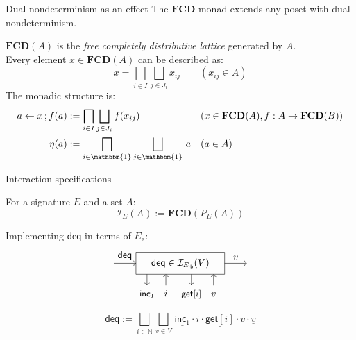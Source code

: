 \documentclass[aspectratio=141]{beamer}
\newcommand{\kw}[1]{\ensuremath{ \mathsf{#1} }}
\newcommand{\deqpic}[3]{%
  \begin{tikzpicture}[scale=0.4]
    \draw[->] (-6,0) -- node[above] {$\kw{deq}$} (-4,0);
    \draw (-4,-1) rectangle (4,1);
    \node (x) at (0,0) {$#1$};
    \draw[->] (-3, -1) -- (-3, -2);
    \node[anchor=base] at (-3, -3) {\small $\kw{inc}_1$};
    \draw[<-] (-1.3, -1) -- (-1.3, -2);
    \node[anchor=base] at (-1.3, -3) {$#2$};
    \draw[->] (1, -1) -- (1, -2);
    \node[anchor=base] at (1, -3) {\small $\kw{get}[#2]$};
    \draw[<-] (3, -1) -- (3, -2);
    \node[anchor=base] at (3, -3) {$#3$};
    \draw[->] (4,0) -- node[above] {$#3$} (6,0);
  \end{tikzpicture}%
}
\begin{document}
\begin{frame}{Dual nondeterminism as an effect} %
The $\mathbf{FCD}$ monad extends any poset with dual nondeterminism.

\pause
\begin{definition}
$\mathbf{FCD}(A)$ is the \emph{free completely distributive lattice}
generated by $A$. \\
Every element $x \in \mathbf{FCD}(A)$ can be described as:
\[
  x = \bigsqcap_{i \in I} \bigsqcup_{j \in J_i} x_{ij}
  \qquad (x_{ij} \in A)
\]
The monadic structure is:
\begin{align*}
  a \leftarrow x \mathop{;} f(a) &:=
    \bigsqcap_{i \in I}
    \bigsqcup_{j \in J_i}
    f(x_{ij}) & &
    (x \in \mathbf{FCD}(A),
     f : A \rightarrow \mathbf{FCD}(B))
  \\
  \eta(a) &:=
    \bigsqcap_{i \in \mathbbm{1}}
    \bigsqcup_{j \in \mathbbm{1}}
    \, a & & (a \in A)
\end{align*}
\end{definition}
\end{frame}

\begin{frame}{Interaction specifications} %
  \begin{definition}
    For a signature $E$ and a set $A$:
    \[
      \mathcal{I}_E(A) := \mathbf{FCD}(P_E(A))
    \]
  \end{definition}
  \pause
  \begin{example}
    Implementing $\kw{deq}$ in terms of $E_\kw{a}$:
    \[
      \deqpic{\kw{deq} \in \mathcal{I}_{E_\kw{rb}}(V)}{i}{v}
    \]
    \[
      \kw{deq} :=
        \bigsqcup_{i \in \mathbb{N}}
        \bigsqcup_{v \in V}
          \, \underline{\kw{inc}_1} \cdot i \cdot
             \underline{\kw{get}[i]} \cdot v \cdot \underline{v}
    \]
  \end{example}
\end{frame}
\end{document}
